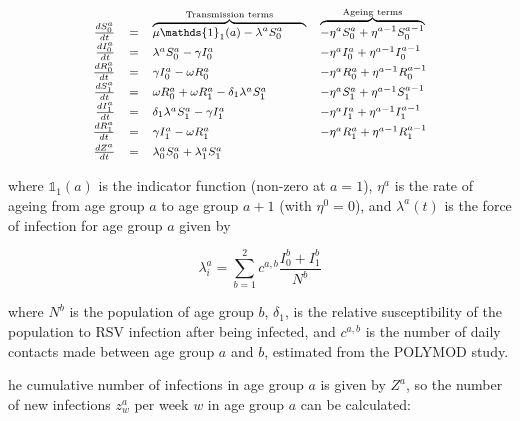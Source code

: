 \documentclass[10pt,twoside]{report} %
\begin{document}
\begin{equation}
\label{eq:1}
\footnotesize\renewcommand{\arraystretch}{1.5}
\begin{array}{r c l l l }
\frac{dS_0^{a}}{dt} & = &  \overbrace{\mu \mathds{1}_1(a) - \lambda^aS_0^{a}\;\;\;\;\;\;\;}^{\text{Transmission terms}}                                                                                                             & \overbrace{- \eta^{a} S_0^{a} + \eta^{a-1}S_0^{a-1}}^{\text{Ageing terms}}       \\
\frac{dI_0^{a}}{dt} & = & \lambda^aS_0^{a} - \gamma I_0^{a} & - \eta^{a} I_0^{a} + \eta^{a-1}I_0^{a-1} \\
\frac{dR_0^{a}}{dt} & = & \gamma I_0^{a} - \omega R_0^{a} 	& - \eta^{a} R_0^{a} + \eta^{a-1}R_0^{a-1} \\

\frac{dS_1^{a}}{dt} & = & \omega R_0^{a} + \omega R_1^{a}   - \delta_1\lambda^aS_1^{a}& - \eta^{a} S_1^{a} + \eta^{a-1}S_1^{a-1}  \\
\frac{dI_1^{a}}{dt} & = & \delta_1\lambda^aS_1^{a} - \gamma I_1^{a} & - \eta^{a} I_1^{a} + \eta^{a-1}I_1^{a-1} \\
\frac{dR_1^{a}}{dt} & = & \gamma I_1^{a}  - \omega R_1^{a}& - \eta^{a} R_1^{a} + \eta^{a-1}R_1^{a-1} \\

\frac{dZ^{a}}{dt} & = &  \lambda^a_0S_0^{a} + \lambda^a_1S_1^{a}\\

\end{array}
\end{equation}

where $\mathds{1}_1(a)$ is the indicator function (non-zero at $a=1$), $\eta^a$ is the rate of ageing from age group $a$ to age group $a+1$ (with $\eta^0 = 0$), and $\lambda^a(t)$ is the force of infection for age group $a$ given by 

\begin{equation}
\label{eq:2}
\lambda_i^a = \sum_{b=1}^2c^{a,b}\frac{I_0^b+I_1^b}{N^b}
\end{equation}

where $N^b$ is the population of age group $b$, $\delta_1$, is the relative susceptibility of the population to RSV infection after being infected, and $c^{a,b}$ is the number of daily contacts made between age group $a$ and $b$, estimated from the POLYMOD study. 
 
 he cumulative number of infections in age group $a$ is given by $Z^a$, so the number of new infections $z_w^a$ per week $w$ in age group $a$ can be calculated:
 
\end{document}
